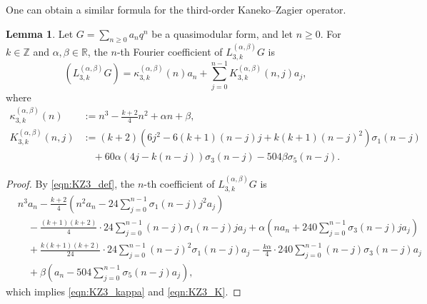 \documentclass[10pt,reqno]{amsproc}
\newcommand{\bR}{\mathbb{R}}
\newcommand{\bZ}{\mathbb{Z}}
\newcommand{\1}{\mathds{1}}	%
\theoremstyle{definition}
\newtheorem{lemma}[theorem]{Lemma}
\theoremstyle{remark}
\begin{document}
One can obtain a similar formula for the third-order Kaneko--Zagier operator.
\begin{lemma}
    \label{lem:KZ3_coeff}
    Let $G = \sum_{n \ge 0} a_n q^n$ be a quasimodular form, and let $n \ge 0$.
    For $k \in \bZ$ and $\alpha,\beta \in \bR$, the $n$-th Fourier coefficient of $L_{3,k}^{(\alpha,\beta)}G$ is
    \begin{equation}
        [q^n] (L_{3,k}^{(\alpha,\beta)}G) = \kappa_{3,k}^{(\alpha,\beta)}(n) a_n + \sum_{j=0}^{n-1} K_{3,k}^{(\alpha,\beta)}(n,j) a_j,
    \end{equation}
    where
    \begin{align}
        \kappa_{3,k}^{(\alpha,\beta)}(n) &:= n^3 - \frac{k+2}{4}n^2 + \alpha n + \beta, \label{eqn:KZ3_kappa} \\
        K_{3,k}^{(\alpha,\beta)}(n,j) &:= (k+2)(6j^2 - 6(k+1)(n-j)j + k(k+1)(n-j)^2) \sigma_1(n-j) \nonumber \\
        &\quad + 60\alpha(4j - k(n-j)) \sigma_3(n-j) - 504\beta \sigma_5(n-j). \label{eqn:KZ3_K}
    \end{align}
\end{lemma}
\begin{proof}
    By \eqref{eqn:KZ3_def}, the $n$-th coefficient of $L_{3,k}^{(\alpha,\beta)}G$ is
    \begin{align*}
        &n^3 a_n - \frac{k+2}{4}\left(n^2 a_n - 24 \sum_{j=0}^{n-1} \sigma_1(n-j)j^2 a_j\right) \\
        &\quad - \frac{(k+1)(k+2)}{4}\cdot 24 \sum_{j=0}^{n-1} (n-j)\sigma_1(n-j) ja_j
         + \alpha \left(na_n + 240 \sum_{j=0}^{n-1} \sigma_3(n-j) ja_j \right) \\
        &\quad + \frac{k(k+1)(k+2)}{24} \cdot 24\sum_{j=0}^{n-1} (n-j)^2 \sigma_1(n-j) a_j
        - \frac{k\alpha}{4} \cdot240 \sum_{j=0}^{n-1} (n-j) \sigma_3(n-j) a_j \\
        &\quad + \beta \left(a_n - 504 \sum_{j=0}^{n-1} \sigma_5(n-j)a_j\right),
    \end{align*}
    which implies \eqref{eqn:KZ3_kappa} and \eqref{eqn:KZ3_K}.
\end{proof}
\end{document}
